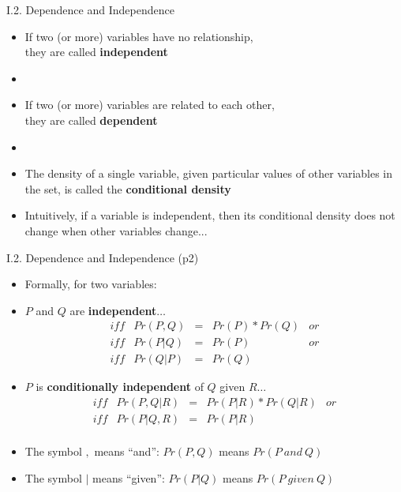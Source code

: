 \documentclass[handout]{beamer}
\newcommand{\stronger}[1]{\textbf{\color{purple} #1}}
\begin{document}
\begin{frame}{I.2. Dependence and Independence}
\begin{itemize}
\item If two (or more) variables have no relationship,\\
 they are called \stronger{independent}
\item[]
\item If two (or more) variables are related to each other, \\
 they are called \stronger{dependent}
\item[]
\item The density of a single variable, given particular values of other variables in the set, is called the \stronger{conditional density}
\item Intuitively, if a variable is independent, then its conditional density does not change when other variables change...
\end{itemize}
\end{frame}
\begin{frame}{I.2. Dependence and Independence (p2)}
\begin{itemize}
\item[] Formally, for two variables:
\item $P$ and $Q$ are \stronger{independent}$\ldots$
\[
\begin{array}{llcll}
iff & Pr( P, Q  ) & = & Pr( P ) * Pr( Q ) & or \\
iff & Pr( P | Q ) & = & Pr( P )           & or \\
iff & Pr( Q | P ) & = & Pr( Q )
\end{array}
\]
\item $P$ is \stronger{conditionally independent} of $Q$ given $R\ldots$
\[
\begin{array}{llcll}
iff & Pr( P, Q | R ) & = & Pr( P | R ) * Pr( Q | R ) & or \\
iff & Pr( P | Q, R ) & = & Pr( P | R ) \\
\end{array}
\]
\item The symbol $,$ means ``and'': $Pr(P,Q)$ means $Pr(P~and~Q)$
\item The symbol $|$ means ``given'': $Pr(P|Q)$ means $Pr(P~given~Q)$
\end{itemize}
\end{frame}
\end{document}
